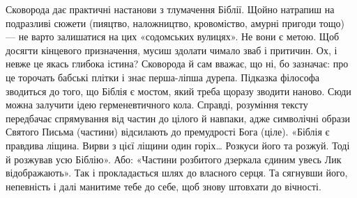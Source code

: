 Сковорода дає практичні настанови з тлумачення Біблії. Щой­но натрапиш на
подразливі сюжети (пияцтво, наложництво, кровоміство, амурні пригоди тощо) — не
варто залишатися на цих «содомських вулицях». Не вони є метою. Щоб досягти
кінцевого призначення, мусиш здолати чимало зваб і притичин. Ох, і невже це
якась глибока істина? Сковорода й сам вважає, що ні, бо зазначає: про це
торочать бабські плітки і знає перша-ліпша дурепа. Підказка філософа зводиться
до того, що Біблія є мостом, який треба щоразу зводити наново. Сюди можна
залучити ідею герменевтичного кола. Справді, розуміння тексту передбачає
спрямування від частин до цілого й навпаки, адже символічні образи Святого
Письма (частини) відсилають до премудрості Бога (ціле). «Біблія є правдива
ліщина. Вирви з цієї ліщини один горіх… Розкуси його та розжуй. Тоді й розжував
усю Біблію». Або: «Частини розбитого дзеркала єдиним увесь Лик відображають».
Так і прокладається шлях до власного серця. Та сягнувши його, непевність і далі
манитиме тебе до себе, щоб знову штовхати до вічності. 
